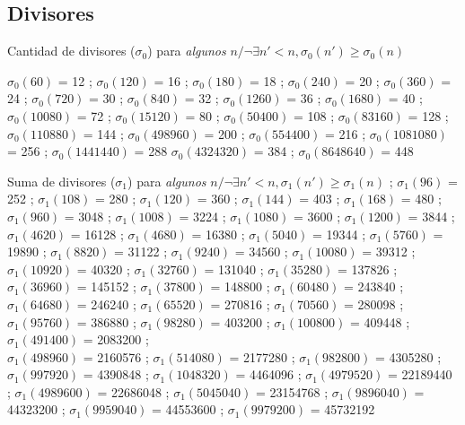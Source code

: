 \documentclass{article}
\begin{document}
\begin{multicols*}{2}
\subsection{Divisores}
Cantidad de divisores ($\sigma_0$) para \emph{algunos} $n / \neg\exists n'<n, \sigma_0(n') \geqslant \sigma_0(n)$

$\sigma_0(60)$ = 12 ; $\sigma_0(120)$ = 16 ; $\sigma_0(180)$ = 18 ; $\sigma_0(240)$ = 20 ; $\sigma_0(360)$ = 24 ;
$\sigma_0(720)$ = 30 ; $\sigma_0(840)$ = 32 ; $\sigma_0(1260)$ = 36 ; $\sigma_0(1680)$ = 40 ; $\sigma_0(10080)$ = 72 ; $\sigma_0(15120)$ = 80 ; $\sigma_0(50400)$ = 108 ; $\sigma_0(83160)$ = 128 ; $\sigma_0(110880)$ = 144 ;
$\sigma_0(498960)$ = 200 ; $\sigma_0(554400)$ = 216 ; $\sigma_0(1081080)$ = 256 ; $\sigma_0(1441440)$ = 288  $\sigma_0(4324320)$ = 384 ; $\sigma_0(8648640)$ = 448

%
Suma de divisores ($\sigma_1$) para \emph{algunos} $n / \neg\exists n'<n, \sigma_1(n') \geqslant \sigma_1(n)$ ;
$\sigma_1(96)$ = 252 ; $\sigma_1(108)$ = 280 ; $\sigma_1(120)$ = 360 ; $\sigma_1(144)$ = 403 ; $\sigma_1(168)$ = 480 ;
$\sigma_1(960)$ = 3048 ; $\sigma_1(1008)$ = 3224 ; $\sigma_1(1080)$ = 3600 ; $\sigma_1(1200)$ = 3844 ;
$\sigma_1(4620)$ = 16128 ; $\sigma_1(4680)$ = 16380 ; $\sigma_1(5040)$ = 19344 ; $\sigma_1(5760)$ = 19890 ;
$\sigma_1(8820)$ = 31122 ; $\sigma_1(9240)$ = 34560 ; $\sigma_1(10080)$ = 39312 ; $\sigma_1(10920)$ = 40320 ;
$\sigma_1(32760)$ = 131040 ; $\sigma_1(35280)$ = 137826 ; $\sigma_1(36960)$ = 145152 ; $\sigma_1(37800)$ = 148800 ;
$\sigma_1(60480)$ = 243840 ; $\sigma_1(64680)$ = 246240 ; $\sigma_1(65520)$ = 270816 ; $\sigma_1(70560)$ = 280098 ;
$\sigma_1(95760)$ = 386880 ; $\sigma_1(98280)$ = 403200 ; $\sigma_1(100800)$ = 409448  ;
$\sigma_1(491400)$ = 2083200 ; \\$\sigma_1(498960)$ = 2160576 ; $\sigma_1(514080)$ = 2177280 ;
$\sigma_1(982800)$ = 4305280 ; $\sigma_1(997920)$ = 4390848 ; $\sigma_1(1048320)$ = 4464096 ;
$\sigma_1(4979520)$ = 22189440 ; $\sigma_1(4989600)$ = 22686048 ; $\sigma_1(5045040)$ = 23154768 ;
$\sigma_1(9896040)$ = 44323200 ; $\sigma_1(9959040)$ = 44553600 ; $\sigma_1(9979200)$ = 45732192
%
%

\end{multicols*}
\end{document}
